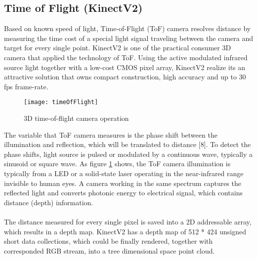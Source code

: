 \subsection{Time of Flight (KinectV2)}
Based on known speed of light, Time-of-Flight (ToF) camera resolves distance by measuring the time cost of a special light signal traveling between the camera and target for every single point. KinectV2 is one of the practical consumer 3D camera that applied the technology of ToF. Using the active modulated infrared source light together with a low-cost CMOS pixel array, KinectV2 realize its an attractive solution that owns compact construction, high accuracy and up to 30 fps frame-rate.\par%
%
%
\begin{figure}[h]
\centering
\texttt{[image: timeOfFlight]}
\caption{3D time-of-flight camera operation}
\label{timeOfFlight}
\end{figure}%
%
The variable that ToF camera measures is the phase shift between the illumination and reflection, which will be translated to distance [8]. %
To detect the phase shifts, light source is pulsed or modulated by a continuous wave, typically a sinusoid or square wave.
As figure \ref{timeOfFlight} shows, the ToF camera illumination is typically from a LED or a solid-state laser operating in the near-infrared range invisible to human eyes. A camera working in the same spectrum captures the reflected light and converts photonic energy to electrical signal, which contains distance (depth) information.
\\\\
The distance measured for every single pixel is saved into a 2D addressable array, which results in a depth map. KinectV2 has a depth map of 512 * 424 unsigned short data collections, which could be finally rendered, together with corresponded RGB stream,  into a tree dimensional space point cloud.
